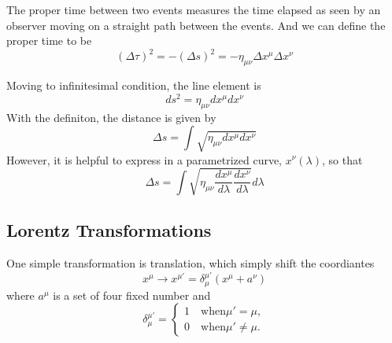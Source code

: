 \documentclass[11pt]{article}
\theoremstyle{definition}
\numberwithin{equation}{section}
\begin{document}
The proper time between two events measures the time elapsed as seen by an observer moving on a straight path between the events. And we can define the proper time to be
\begin{equation}
    (\Delta \tau)^2 = -(\Delta s)^2 = -\eta_{\mu\nu}\Delta x^\mu \Delta x^\nu
\end{equation}

Moving to infinitesimal condition, the line element is
\begin{equation}
    ds^2 = \eta_{\mu\nu} dx^\mu dx^\nu
\end{equation}
With the definiton, the distance is given by
\begin{equation}
    \Delta s = \int\sqrt{\eta_{\mu\nu} dx^\mu dx^\nu}
\end{equation}
However, it is helpful to express in a parametrized curve, $x^\nu(\lambda)$, so that
\begin{equation}
    \Delta s = \int \sqrt{\eta_{\mu\nu} \frac{dx^\mu}{d\lambda}\frac{dx^\nu}{d\lambda}} d\lambda
\end{equation}

\subsection{Lorentz Transformations}
One simple transformation is translation, which simply shift the coordiantes
\begin{equation}
    x^{\mu} \rightarrow x^{\mu'} = \delta_\mu^{\mu'} (x^\mu + a^\nu)
\end{equation}
where $a^\mu$ is a set of four fixed number and 
\begin{equation}
    \delta_\mu^{\mu'} = \left\{
        \begin{aligned}
            1 \quad \text{when} \mu'=\mu,\\
            0 \quad \text{when} \mu'\ne\mu.
        \end{aligned}
        \right.
\end{equation}
\end{document}
